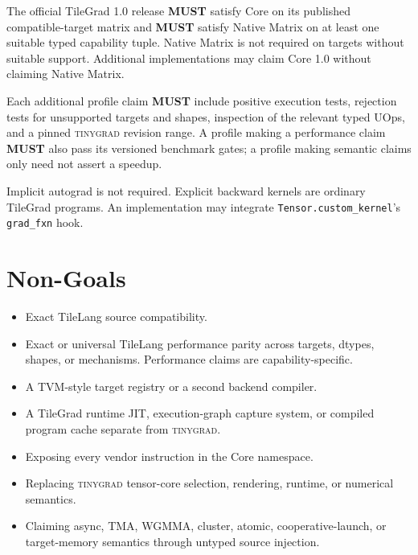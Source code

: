 \documentclass[10pt,letterpaper]{article}
\newcommand{\tinygrad}{\textsc{tinygrad}}
\newcommand{\must}{\textbf{MUST}}
\begin{document}
The official TileGrad 1.0 release \must{} satisfy Core on its published
compatible-target matrix and \must{} satisfy Native Matrix on at least one
suitable typed capability tuple. Native Matrix is not required on targets
without suitable support. Additional implementations may claim Core 1.0 without
claiming Native Matrix.

Each additional profile claim \must{} include positive execution tests,
rejection tests for unsupported targets and shapes, inspection of the relevant
typed UOps, and a pinned \tinygrad{} revision range. A profile making a
performance claim \must{} also pass its versioned benchmark gates; a profile
making semantic claims only need not assert a speedup.

Implicit autograd is not required. Explicit backward kernels are ordinary
TileGrad programs. An implementation may integrate
\texttt{Tensor.custom\_kernel}'s \texttt{grad\_fxn} hook.

\section*{Non-Goals}

\begin{itemize}
  \item Exact TileLang source compatibility.
  \item Exact or universal TileLang performance parity across targets, dtypes,
        shapes, or mechanisms. Performance claims are capability-specific.
  \item A TVM-style target registry or a second backend compiler.
  \item A TileGrad runtime JIT, execution-graph capture system, or compiled
        program cache separate from \tinygrad{}.
  \item Exposing every vendor instruction in the Core namespace.
  \item Replacing \tinygrad{} tensor-core selection, rendering, runtime, or
        numerical semantics.
  \item Claiming async, TMA, WGMMA, cluster, atomic, cooperative-launch, or
        target-memory semantics through untyped source injection.
\end{itemize}
\end{document}
